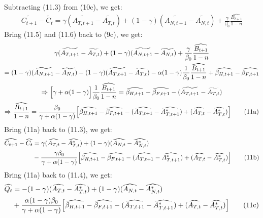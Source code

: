 \documentclass[a4paper,12pt]{article} %
\theoremstyle{nonitalic}
\begin{document}
Subtracting (11.3) from (10c), we get:
\begin{gather*}
    \widetilde{C_{t+1}} - \widetilde{C_t} = \gamma(\widetilde{A_{T,t+1}} - \widetilde{A_{T,t}}) + (1-\gamma) (\widetilde{A_{N,t+1}} - \widetilde{A_{N,t}}) + \frac{\gamma}{\beta_0} \frac{\widehat{B_{t+1}}}{1-n} \tag{11.6}
\end{gather*} 
Bring (11.5) and (11.6) back to (9c), we get:
\begin{gather*}
    \gamma (\widetilde{A_{T,t+1}} - \widetilde{A_{T,t}}) + (1-\gamma) (\widetilde{A_{N,t+1}} - \widetilde{A_{N,t}}) + \frac{\gamma}{\beta_0} \frac{\widehat{B_{t+1}}}{1-n} \\
    = (1-\gamma) (\widetilde{A_{N,t+1}} - \widetilde{A_{N,t}}) - (1-\gamma) (\widetilde{A_{T,t+1}} - \widetilde{A_{T,t}}) - \alpha(1-\gamma) \frac{1}{\beta_0} \frac{\widehat{B_{t+1}}}{1-n} + \widehat{\beta_{H,t+1}} - \widehat{\beta_{F,t+1}} \\
    \Rightarrow \Bigl[\gamma + \alpha(1-\gamma)\Bigr] \frac{1}{\beta_0} \frac{\widehat{B_{t+1}}}{1-n} = \widehat{\beta_{H,t+1}} - \widehat{\beta_{F,t+1}} - (\widetilde{A_{T,t+1}} - \widetilde{A_{T,t}}) \\
    \Rightarrow \frac{\widehat{B_{t+1}}}{1-n} = \frac{\beta_0}{\gamma + \alpha(1-\gamma)} \Bigl[ \widehat{\beta_{H,t+1}} - \widehat{\beta_{F,t+1}} - (\widehat{A_{T,t+1}} - \widehat{A_{T,t+1}^*}) + (\widehat{A_{T,t}} - \widehat{A_{T,t}^*}) \Bigr] \tag{11a}
\end{gather*}
Bring (11a) back to (11.3), we get:
\begin{align*}
    \widehat{C_{t+1}} - \widehat{C_t} &= \gamma (\widehat{A_{T,t}} - \widehat{A_{T,t}^*}) + (1-\gamma) (\widehat{A_{N,t}} - \widehat{A_{N,t}^*}) \\
    &- \frac{\gamma \beta_0}{\gamma + \alpha(1-\gamma)} \Bigl[ \widehat{\beta_{H,t+1}} - \widehat{\beta_{F,t+1}} - (\widehat{A_{T,t+1}} - \widehat{A_{T,t+1}^*}) + (\widehat{A_{T,t}} - \widehat{A_{T,t}^*}) \Bigr] \tag{11b}
\end{align*}
Bring (11a) back to (11.4), we get:
\begin{align*}
    \widehat{Q_t} &= -(1-\gamma) (\widehat{A_{T,t}} - \widehat{A_{T,t}^*}) + (1-\gamma) (\widehat{A_{N,t}} - \widehat{A_{N,t}^*}) \\
    &+ \frac{\alpha (1-\gamma) \beta_0}{\gamma + \alpha(1-\gamma)} \Bigl[ \widehat{\beta_{H,t+1}} - \widehat{\beta_{F,t+1}} - (\widehat{A_{T,t+1}} - \widehat{A_{T,t+1}^*}) + (\widehat{A_{T,t}} - \widehat{A_{T,t}^*}) \Bigr] \tag{11c}
\end{align*}
\end{document}
